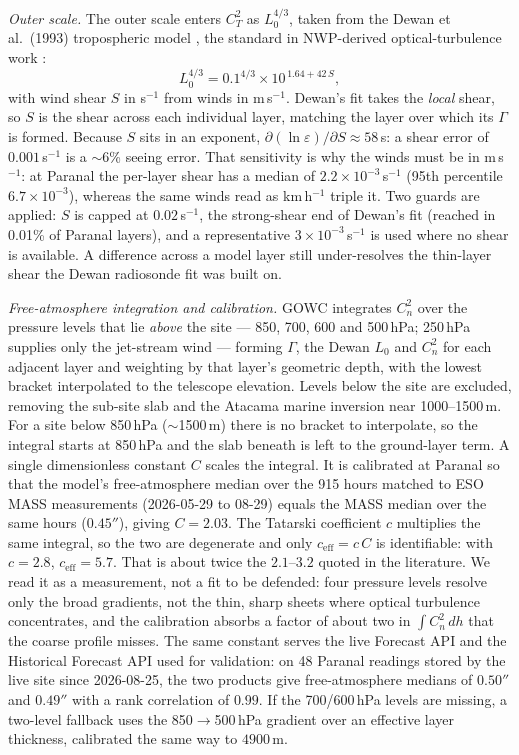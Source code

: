 \documentclass[11pt]{article}
\begin{document}
\emph{Outer scale.} The outer scale enters $C_T^2$ as $L_0^{4/3}$, taken from the
Dewan et al.\ (1993) tropospheric model \cite{dewan}, the standard in NWP-derived
optical-turbulence work \cite{trinquet}:
\[
L_0^{4/3} = 0.1^{4/3}\times 10^{\,1.64 + 42\,S},
\]
with wind shear $S$ in s$^{-1}$ from winds in m\,s$^{-1}$. Dewan's fit takes the
\emph{local} shear, so $S$ is the shear across each individual layer, matching the
layer over which its $\Gamma$ is formed. Because $S$ sits in an exponent,
$\partial(\ln\varepsilon)/\partial S \approx 58$\,s: a shear error of
$0.001$\,s$^{-1}$ is a $\sim$6\% seeing error. That sensitivity is why the
winds must be in m\,s$^{-1}$: at Paranal the per-layer shear has a median of
$2.2\times10^{-3}$\,s$^{-1}$ (95th percentile $6.7\times10^{-3}$), whereas the same
winds read as km\,h$^{-1}$ triple it. Two guards are applied: $S$ is capped at
$0.02$\,s$^{-1}$, the strong-shear end of Dewan's fit (reached in 0.01\% of Paranal
layers), and a representative $3\times10^{-3}$\,s$^{-1}$ is used where no shear is
available. A difference across a model layer still under-resolves the thin-layer
shear the Dewan radiosonde fit was built on.

\emph{Free-atmosphere integration and calibration.} GOWC integrates $C_n^2$ over the
pressure levels that lie \emph{above} the site --- 850, 700, 600 and 500\,hPa;
250\,hPa supplies only the jet-stream wind --- forming $\Gamma$, the Dewan $L_0$ and
$C_n^2$ for each adjacent layer and weighting by that layer's geometric depth, with
the lowest bracket interpolated to the telescope elevation. Levels below the site
are excluded, removing the sub-site slab and the Atacama marine inversion near
1000--1500\,m. For a site below 850\,hPa ($\sim$1500\,m) there is no bracket to
interpolate, so the integral starts at 850\,hPa and the slab beneath is left to the
ground-layer term. A single dimensionless constant $C$ scales the integral. It is
calibrated at Paranal so that the model's free-atmosphere median over the 915 hours
matched to ESO MASS measurements (2026-05-29 to 08-29) equals the MASS median over
the same hours ($0.45''$), giving $C=2.03$. The Tatarski coefficient $c$ multiplies
the same integral, so the two are degenerate and only $c_{\text{eff}}=c\,C$ is
identifiable: with $c=2.8$, $c_{\text{eff}}=5.7$. That is about twice the
$2.1$--$3.2$ quoted in the literature. We read it as a measurement, not a fit to be
defended: four pressure levels resolve only the broad gradients, not the thin, sharp
sheets where optical turbulence concentrates, and the calibration absorbs a factor
of about two in $\int C_n^2\,dh$ that the coarse profile misses. The same constant serves the live Forecast API
and the Historical Forecast API used for validation: on 48 Paranal readings stored by
the live site since 2026-08-25, the two products give free-atmosphere medians of
$0.50''$ and $0.49''$ with a rank correlation of $0.99$. If the 700/600\,hPa levels
are missing, a two-level fallback uses the 850$\to$500\,hPa gradient over an effective
layer thickness, calibrated the same way to $4900$\,m.
\end{document}
